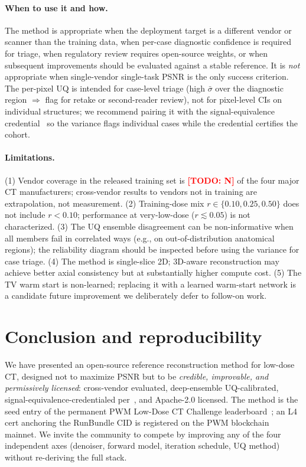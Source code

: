 \documentclass{article}  %
\newcommand{\todo}[1]{\textcolor{red}{\textbf{[TODO: #1]}}}
\begin{document}
\paragraph{When to use it and how.} The method is appropriate when the deployment target is a different vendor or scanner than the training data, when per-case diagnostic confidence is required for triage, when regulatory review requires open-source weights, or when subsequent improvements should be evaluated against a stable reference. It is \emph{not} appropriate when single-vendor single-task PSNR is the only success criterion. The per-pixel UQ is intended for case-level triage (high $\bar{\sigma}$ over the diagnostic region $\Rightarrow$ flag for retake or second-reader review), not for pixel-level CIs on individual structures; we recommend pairing it with the signal-equivalence credential~\citep{ws2framework} so the variance flags individual cases while the credential certifies the cohort.

\paragraph{Limitations.} (1) Vendor coverage in the released training set is \todo{N} of the four major CT manufacturers; cross-vendor results to vendors not in training are extrapolation, not measurement. (2) Training-dose mix $r \in \{0.10, 0.25, 0.50\}$ does not include $r < 0.10$; performance at very-low-dose ($r \lesssim 0.05$) is not characterized. (3) The UQ ensemble disagreement can be non-informative when all members fail in correlated ways (e.g., on out-of-distribution anatomical regions); the reliability diagram should be inspected before using the variance for case triage. (4) The method is single-slice 2D; 3D-aware reconstruction may achieve better axial consistency but at substantially higher compute cost. (5) The TV warm start is non-learned; replacing it with a learned warm-start network is a candidate future improvement we deliberately defer to follow-on work.

\section{Conclusion and reproducibility}

We have presented an open-source reference reconstruction method for low-dose CT, designed not to maximize PSNR but to be \emph{credible, improvable, and permissively licensed}: cross-vendor evaluated, deep-ensemble UQ-calibrated, signal-equivalence-credentialed per~\citep{ws2framework}, and Apache-2.0 licensed. The method is the seed entry of the permanent PWM Low-Dose CT Challenge leaderboard~\citep{ws4leaderboard}; an L4 cert anchoring the RunBundle CID is registered on the PWM blockchain mainnet. We invite the community to compete by improving any of the four independent axes (denoiser, forward model, iteration schedule, UQ method) without re-deriving the full stack.
\end{document}
